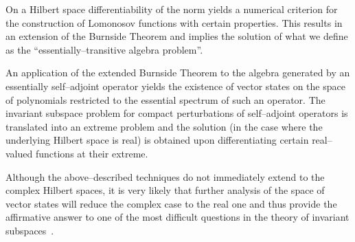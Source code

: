 On a Hilbert space differentiability of the norm yields a
numerical criterion for the construction of Lomonosov functions
with certain properties. This results in an extension of the
Burnside Theorem and implies the solution of what we define as
the ``essentially--transitive algebra problem''.

An application of the extended Burnside Theorem to the algebra
generated by an essentially self--adjoint operator yields the
existence of vector states on the space of polynomials
restricted to the essential spectrum of such an operator. The
invariant subspace problem for compact perturbations of
self--adjoint operators is translated into an extreme problem
and the solution (in the case where the underlying Hilbert
space is real) is obtained upon differentiating certain
real--valued functions at their extreme.

Although the above--described techniques do not immediately
extend to the complex Hilbert spaces, it is very likely that
further analysis of the space of vector states will reduce the
complex case to the real one and thus provide the affirmative
answer to one of the most difficult questions in the theory of
invariant subspaces~\cite{Lom92}.

